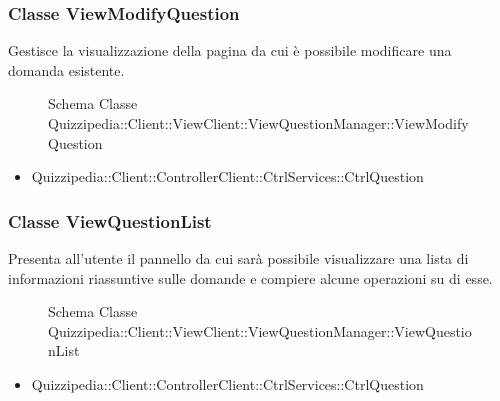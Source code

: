 \subsubsection{Classe ViewModifyQuestion}
Gestisce la visualizzazione della pagina da cui è possibile modificare una domanda esistente.
\begin{figure}[H]
\centering
\noindent{}
\caption[Schema Classe ViewModifyQuestion]{Schema Classe Quizzipedia::Client::ViewClient::ViewQuestionManager::ViewModifyQuestion}
\end{figure}
\begin{itemize}
\item Quizzipedia::Client::ControllerClient::CtrlServices::CtrlQuestion
\end{itemize}
\subsubsection{Classe ViewQuestionList}
Presenta all'utente il pannello da cui sarà possibile visualizzare una lista di informazioni riassuntive sulle domande e compiere alcune operazioni su di esse.
\begin{figure}[H]
\centering
\noindent{}
\caption[Schema Classe ViewQuestionList]{Schema Classe Quizzipedia::Client::ViewClient::ViewQuestionManager::ViewQuestionList}
\end{figure}
\begin{itemize}
\item Quizzipedia::Client::ControllerClient::CtrlServices::CtrlQuestion
\end{itemize}
